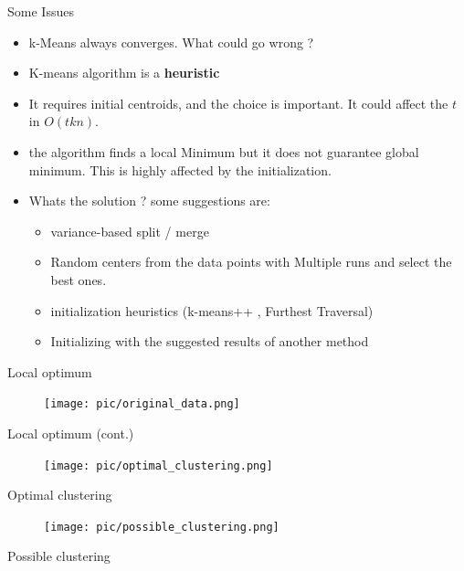 \documentclass[serif, aspectratio=169]{beamer}
\begin{document}
\begin{frame}{Some Issues}
    \begin{itemize}
        \item k-Means always converges. What could go wrong ?
        \item K-means algorithm is a \textbf{heuristic}
        \item It requires initial centroids, and the choice is important. It could affect the $t$ in $O(tkn)$.
        \item the algorithm finds a local Minimum but it does not guarantee global minimum. This is highly affected by the initialization.
        \item Whats the solution ? some suggestions are:
        \begin{itemize}
            \item  variance-based split / merge
            \item Random centers from the data points with Multiple runs and select the best ones.
            \item initialization heuristics (k-means++ , Furthest Traversal)
            \item  Initializing with the suggested results of another method
        \end{itemize}
        
        
    \end{itemize}
\end{frame}

\begin{frame}{Local optimum}
    \begin{itemize}
        \begin{figure}
            \centering
            \texttt{[image: pic/original\_data.png]}
        \end{figure}
    \end{itemize}
\end{frame}
\begin{frame}{Local optimum (cont.)}
    \begin{minipage}{0.5\textwidth}
        \begin{figure}
            \centering
            \texttt{[image: pic/optimal\_clustering.png]}
        \end{figure}
        \vfill
        \begin{center}
            Optimal clustering
        \end{center}
    \end{minipage}%
    \begin{minipage}{0.5\textwidth}
        \begin{figure}
            \centering
            \texttt{[image: pic/possible\_clustering.png]}
        \end{figure}
        \vfill
        \begin{center}
            Possible clustering
        \end{center}
    \end{minipage}
\end{frame}
\end{document}
